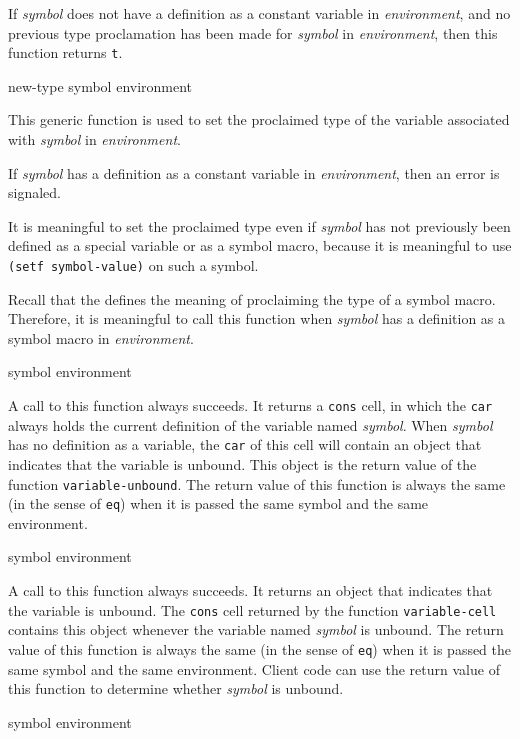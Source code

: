 If \textit{symbol} does not have a definition as a constant variable
in \textit{environment}, and no previous type proclamation has been
made for \textit{symbol} in \textit{environment}, then this function
returns \texttt{t}.

 {new-type symbol environment}

This generic function is used to set the proclaimed type of the
variable associated with \textit{symbol} in \textit{environment}.

If \textit{symbol} has a definition as a constant variable in
\textit{environment}, then an error is signaled.

It is meaningful to set the proclaimed type even if \textit{symbol}
has not previously been defined as a special variable or as a symbol
macro, because it is meaningful to use \texttt{(setf symbol-value)} on
such a symbol.

Recall that the \hs{} defines the meaning of proclaiming the type of a
symbol macro.  Therefore, it is meaningful to call this function when
\textit{symbol} has a definition as a symbol macro in
\textit{environment}.

 {symbol environment}

A call to this function always succeeds.  It returns a \texttt{cons}
cell, in which the \texttt{car} always holds the current definition of
the variable named \textit{symbol}.  When \textit{symbol} has no
definition as a variable, the \texttt{car} of this cell will contain
an object that indicates that the variable is unbound.  This object is
the return value of the function \texttt{variable-unbound}.  The
return value of this function is always the same (in the sense of
\texttt{eq}) when it is passed the same symbol and the same
environment.

 {symbol environment}

A call to this function always succeeds.  It returns an object that
indicates that the variable is unbound.  The \texttt{cons} cell
returned by the function \texttt{variable-cell} contains this object
whenever the variable named \textit{symbol} is unbound.  The return
value of this function is always the same (in the sense of
\texttt{eq}) when it is passed the same symbol and the same
environment.  Client code can use the return value of this function to
determine whether \textit{symbol} is unbound.

 {symbol environment}

